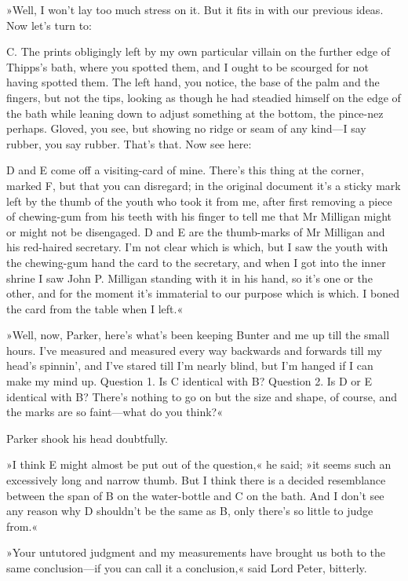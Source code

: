 »Well, I won't lay too much stress on it. But it fits in with our previous ideas. Now let's turn to:

\textsc{C.} The prints obligingly left by my own particular villain on the further edge of Thipps's bath, where you spotted them, and I ought to be scourged for not having spotted them. The left hand, you notice, the base of the palm and the fingers, but not the tips, looking as though he had steadied himself on the edge of the bath while leaning down to adjust something at the bottom, the pince-nez perhaps. Gloved, you see, but showing no ridge or seam of any kind\allowbreak---\allowbreak I say rubber, you say rubber. That's that. Now see here:

\textsc{D} and \textsc{E} come off a visiting-card of mine. There's this thing at the corner, marked F, but that you can disregard; in the original document it's a sticky mark left by the thumb of the youth who took it from me, after first removing a piece of chewing-gum from his teeth with his finger to tell me that Mr Milligan might or might not be disengaged. D and E are the thumb-marks of Mr Milligan and his red-haired secretary. I'm not clear which is which, but I saw the youth with the chewing-gum hand the card to the secretary, and when I got into the inner shrine I saw John P. Milligan standing with it in his hand, so it's one or the other, and for the moment it's immaterial to our purpose which is which. I boned the card from the table when I left.«

»Well, now, Parker, here's what's been keeping Bunter and me up till the small hours. I've measured and measured every way backwards and forwards till my head's spinnin', and I've stared till I'm nearly blind, but I'm hanged if I can make my mind up. Question 1. Is \textsc{C} identical with \textsc{B}? Question 2. Is \textsc{D} or \textsc{E} identical with \textsc{B}? There's nothing to go on but the size and shape, of course, and the marks are so faint\allowbreak---\allowbreak what do you think?«

Parker shook his head doubtfully.

»I think \textsc{E} might almost be put out of the question,« he said; »it seems such an excessively long and narrow thumb. But I think there is a decided resemblance between the span of \textsc{B} on the water-bottle and \textsc{C} on the bath. And I don't see any reason why \textsc{D} shouldn't be the same as \textsc{B}, only there's so little to judge from.«

»Your untutored judgment and my measurements have brought us both to the same conclusion\allowbreak---\allowbreak if you can call it a conclusion,« said Lord Peter, bitterly.


